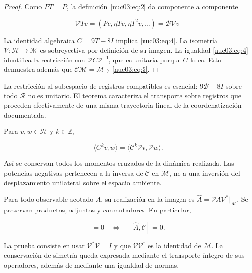 \begin{proof}
Como \(PT=P\), la definición~\eqref{nuc03:eq:2} da componente a componente

\[
\mathcal VT v=(Pv,\eta Tv,\eta T^2v,\ldots)=\mathcal B\mathcal Vv.
\]

La identidad algebraica \(C=9T-8I\) implica \eqref{nuc03:eq:4}. La isometría \(\mathcal V:\mathcal H\to\mathcal M\) es sobreyectiva por definición de su imagen. La igualdad \eqref{nuc03:eq:4} identifica la restricción con \(\mathcal V C\mathcal V^{-1}\), que es unitaria porque \(C\) lo es. Esto demuestra además que \(\mathcal C\mathcal M=\mathcal M\) y \eqref{nuc03:eq:5}.
\end{proof}

La restricción al subespacio de registros compatibles es esencial: \(9\mathcal B-8I\) sobre todo \(\mathcal R\) no es unitario. El teorema caracteriza el transporte sobre registros que proceden efectivamente de una misma trayectoria lineal de la coordenatización documentada.

\begin{corollary}
Para \(v,w\in\mathcal H\) y \(k\in\mathbb Z\),

\begin{equation}
\langle C^kv,w\rangle
=\langle\mathcal C^k\mathcal Vv,\mathcal Vw\rangle.
\label{nuc03:eq:6}
\end{equation}

Así se conservan todos los momentos cruzados de la dinámica realizada. Las potencias negativas pertenecen a la inversa de \(\mathcal C\) en \(\mathcal M\), no a una inversión del desplazamiento unilateral sobre el espacio ambiente.
\end{corollary}

\begin{corollary}
Para todo observable acotado \(A\), su realización en la imagen es \(\widehat A=\mathcal V A\mathcal V^*|_{\mathcal M}\). Se preservan productos, adjuntos y conmutadores. En particular,

\begin{equation}
[A,C]=0\quad\Longleftrightarrow\quad[\widehat A,\mathcal C]=0.
\label{nuc03:eq:7}
\end{equation}
\end{corollary}

La prueba consiste en usar \(\mathcal V^*\mathcal V=I\) y que \(\mathcal V\mathcal V^*\) es la identidad de \(\mathcal M\). La conservación de simetría queda expresada mediante el transporte íntegro de sus operadores, además de mediante una igualdad de normas.

